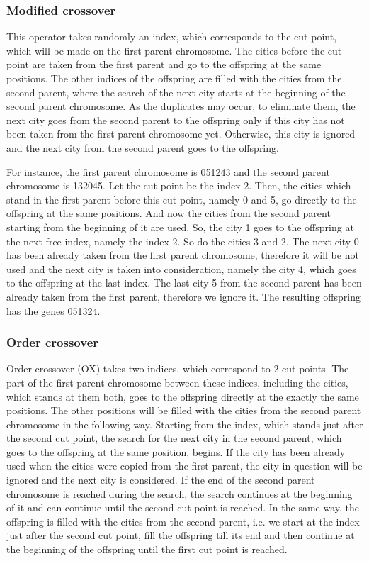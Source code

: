 \documentclass[a4paper, 12pt, headings=standardclasses]{scrartcl}
\begin{document}
\subsubsection{Modified crossover}
This operator takes randomly an index, which corresponds to the cut point, which will be made on the first parent chromosome.
The cities before the cut point are taken from the first parent and go to the offspring at the same positions. The other indices of the offspring are filled with the cities from the second parent, where the search of the next city starts at the beginning of the second parent chromosome. As the duplicates may occur, to eliminate them, the next city goes from the second parent to the offspring only if this city has not been taken from the first parent chromosome yet. Otherwise, this city is ignored and the next city from the second parent goes to the offspring.\par

For instance, the first parent chromosome is 051243 and the second parent chromosome is 132045. Let the cut point be the index 2. Then, the cities which stand in the first parent before this cut point, namely 0 and 5, go directly to the offspring at the same positions. And now the cities from the second parent starting from the beginning of it are used. So, the city 1 goes to the offspring at the next free index, namely the index 2. So do the cities 3 and 2. The next city 0 has been already taken from the first parent chromosome, therefore it will be not used and the next city is taken into consideration, namely the city 4, which goes to the offspring at the last index. The last city 5 from the second parent has been already taken from the first parent, therefore we ignore it. The resulting offspring has the genes 051324.\par

\subsubsection{Order crossover}

Order crossover (OX) takes two indices, which correspond to 2 cut points. The part of the first parent chromosome between these indices, including the cities, which stands at them both, goes to the offspring directly at the exactly the same positions. The other positions will be filled with the cities from the second parent chromosome in the following way. Starting from the index, which stands just after the second cut point, the search for the next city in the second parent, which goes to the offspring at the same position, begins. If the city has been already used when the cities were copied from the first parent, the city in question will be ignored and the next city is considered. If the end of the second parent chromosome is reached during the search, the search continues at the beginning of it and can continue until the second cut point is reached. In the same way, the offspring is filled with the cities from the second parent, i.e. we start at the index just after the second cut point, fill the offspring till its end and then continue at the beginning of the offspring until the first cut point is reached.\par
\end{document}
